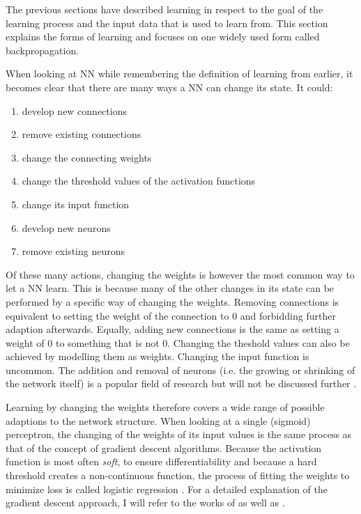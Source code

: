 The previous sections have described learning in respect to the goal of the learning process and the input data that is
used to learn from. This section explains the forms of learning and focuses on one widely used form called
backpropagation.

When looking at \ac{NN} while remembering the definition of learning from earlier, it becomes clear that there are many
ways a \ac{NN} can change its state. It could:

\begin{enumerate}
    \item develop new connections
    \item remove existing connections
    \item change the connecting weights
    \item change the threshold values of the activation functions
    \item change its input function
    \item develop new neurons
    \item remove existing neurons \cite[p.60]{kriesel2007brief}
\end{enumerate}

Of these many actions, changing the weights is however the most common way to let a \ac{NN} learn. This is because many
of the other changes in its state can be performed by a specific way of changing the weights. Removing connections is
equivalent to setting the weight of the connection to 0 and forbidding further adaption afterwards. Equally, adding new
connections is the same as setting a weight of 0 to something that is not 0. Changing the theshold values can also be
achieved by modelling them as weights. Changing the input function is uncommon. The addition and removal of neurons
(i.e. the growing or shrinking of the network itself) is a popular field of research but will not be discussed further
\cite[p.60]{kriesel2007brief}.

Learning by changing the weights therefore covers a wide range of possible adaptions to the network structure. When
looking at a single (sigmoid) perceptron, the changing of the weights of its input values is the same process as that of the
concept of gradient descent algorithms. Because the activation function is most often \emph{soft}, to ensure
differentiability and because a hard threshold creates a non-continuous function, the process of fitting the weights to
minimize loss is called logistic regression \cite[p.729f.]{russell2016artificial}. For a detailed explanation of the gradient
descent approach, I will refer to the works of \citet{russell2016artificial} as well as
\citet{Goodfellow-et-al-2016}.



